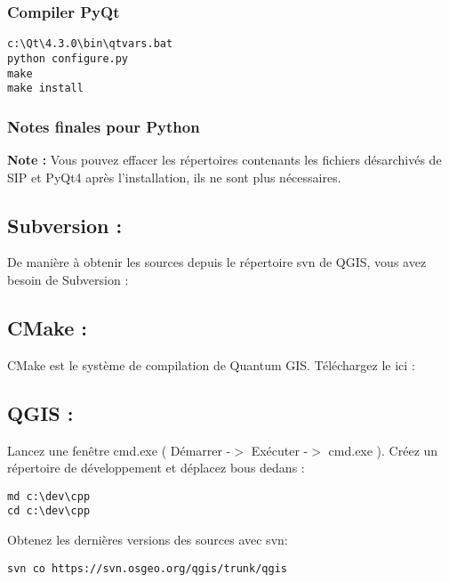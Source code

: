 \subsubsection{Compiler PyQt}
\begin{verbatim}
c:\Qt\4.3.0\bin\qtvars.bat 
python configure.py 
make 
make install 
\end{verbatim}

\subsubsection{Notes finales pour Python}

\textbf{Note :} Vous pouvez effacer les r\'epertoires contenants les fichiers d\'esarchiv\'es de SIP et PyQt4 apr\`es l'installation, ils ne sont plus n\'ecessaires.

\subsection{Subversion :}
De mani\`ere \`a obtenir les sources depuis le r\'epertoire svn de QGIS, vous avez besoin de Subversion :


\subsection{CMake :}
CMake est le syst\`eme de compilation de Quantum GIS. T\'el\'echargez le ici :


\subsection{QGIS :}
Lancez une fen\^etre cmd.exe ( D\'emarrer -$>$ Ex\'ecuter -$>$ cmd.exe ). Cr\'eez un r\'epertoire de d\'eveloppement et d\'eplacez bous dedans :

\begin{verbatim}
md c:\dev\cpp 
cd c:\dev\cpp 
\end{verbatim}

Obtenez les derni\`eres versions des sources avec svn:

\begin{verbatim}
svn co https://svn.osgeo.org/qgis/trunk/qgis 
\end{verbatim}

